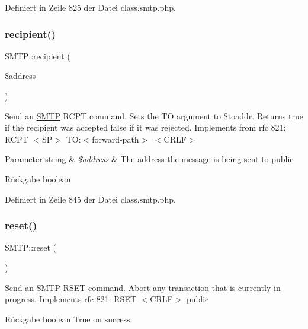 Definiert in Zeile 825 der Datei class.\+smtp.\+php.

\mbox{\label{class_s_m_t_p_ae81a24cd96bcd70612f7ee66c03576f5}} 
\subsubsection{\texorpdfstring{recipient()}{recipient()}}
{\footnotesize\ttfamily S\+M\+T\+P\+::recipient (\begin{DoxyParamCaption}\item[{}]{\$address }\end{DoxyParamCaption})}

Send an \mbox{\hyperlink{class_s_m_t_p}{S\+M\+TP}} R\+C\+PT command. Sets the TO argument to \$toaddr. Returns true if the recipient was accepted false if it was rejected. Implements from rfc 821\+: R\+C\+PT $<$\+S\+P$>$ TO\+:$<$forward-\/path$>$ $<$\+C\+R\+L\+F$>$ 
\begin{DoxyParams}[1]{Parameter}
string & {\em \$address} & The address the message is being sent to  public \\
\hline
\end{DoxyParams}
\begin{DoxyReturn}{Rückgabe}
boolean 
\end{DoxyReturn}


Definiert in Zeile 845 der Datei class.\+smtp.\+php.

\mbox{\label{class_s_m_t_p_a921087a737bbc78e78bbe798de7e4273}} 
\subsubsection{\texorpdfstring{reset()}{reset()}}
{\footnotesize\ttfamily S\+M\+T\+P\+::reset (\begin{DoxyParamCaption}{ }\end{DoxyParamCaption})}

Send an \mbox{\hyperlink{class_s_m_t_p}{S\+M\+TP}} R\+S\+ET command. Abort any transaction that is currently in progress. Implements rfc 821\+: R\+S\+ET $<$\+C\+R\+L\+F$>$  public \begin{DoxyReturn}{Rückgabe}
boolean True on success. 
\end{DoxyReturn}


